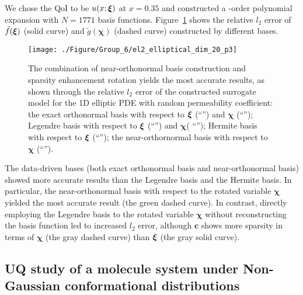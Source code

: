 We chose the \ac{QoI} to be $u(x;\bm\xi)$ at $x=0.35$ and constructed a -order polynomial expansion with $N=1771$ basis functions.
Figure~\ref{fig:err_elliptical_dim_20_p_3} shows the relative $l_2$ error of $\tilde{f}(\bm\xi)$ (solid curve) and $\tilde{g}(\bm\chi)$ (dashed curve) constructed by different bases.
\begin{figure}[tbp]
  \center
  \texttt{[image: ./Figure/Group\_6/el2\_elliptical\_dim\_20\_p3]}
  \caption{The combination of near-orthonormal basis construction and sparsity enhancement rotation
  yields the most accurate results, as shown through the relative $l_2$ error of the constructed surrogate model for the 1D elliptic \ac{PDE} 
  with random permeability coefficient: the exact orthonormal  basis with respect to $\bm\xi$ 
    (``\textcolor{red}{\protect\rectanglesolidline}'') and 
  $\bm\chi$ (``\textcolor{red}{\protect\rectangledashline}''); 
  Legendre basis with respect to $\bm\xi$ (``\textcolor{blue}{\protect\diamondsolidline}'') and 
  $\bm\chi$( ``\textcolor{blue}{\protect\diamonddashline}'');
  Hermite basis with respect to $\bm\xi$ (``\textcolor{gray}{\protect\downtrianglesolidline}'');
  the near-orthornormal  basis with respect to $\bm\chi$ (``\textcolor{green}{\protect\triangledashline}'').
  } \label{fig:err_elliptical_dim_20_p_3}
\end{figure}
The data-driven bases (both exact orthonormal basis and near-orthonormal basis) showed more accurate results than the Legendre basis and the Hermite basis.
In particular, the near-orthonormal basis with respect to the rotated variable $\bm\chi$ yielded the most accurate result (the green dashed curve).
In contrast, directly employing the Legendre basis to the rotated  variable $\bm\chi$ without reconstructing the basis function led to increased $l_2$ error, although $\bm c$ shows more sparsity in terms of $\bm\chi$ (the gray dashed curve) than $\bm\xi$ (the gray solid curve). 

\subsection{\ac{UQ} study of a molecule system under Non-Gaussian conformational distributions}\label{sec:mole_example}

